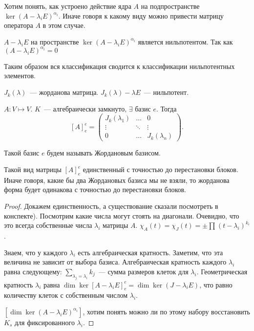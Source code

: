 \begin{motivation}
    Хотим понять, как устроено действие ядра $A$ на подпространстве $\ker (A - \lambda_iE)^{\alpha_i}$.
    Иначе говоря к какому виду можно привести матрицу оператора $A$ в этом случае.
\end{motivation}
\begin{remark}
    $A - \lambda_iE$ на пространстве $\ker(A - \lambda_iE)^{\alpha_i}$ является нильпотентом.
    Так как $(A - \lambda_iE)^{\alpha_i} = 0$
\end{remark}
\begin{motivation}
    Таким образом вся классификация сводится к классификации нильпотентных элементов.
\end{motivation}
\begin{definition}
    $J_k(\lambda)$~--- жорданова матрица.
    $J_k(\lambda) - \lambda E$~--- нильпотент.
\end{definition}
\begin{theorem}
    $A\colon V\mapsto V$. $K$~--- алгебраически замкнуто, $\exists$ базис $e$.
    Тогда 
     \[
         [A]^e_e =
         \begin{pmatrix}
             J_k(\lambda_1) & \dots & 0\\
             \vdots & \ddots & \vdots\\
             0 & \dots & J_k(\lambda_n)
         \end{pmatrix}
    .\] 
    \begin{definition}
        Такой базис $e$ будем называть Жордановым базисом.
    \end{definition}
    Такой вид матрицы $[A]^e_e$ единственный с точностью до перестановки блоков.
    Иначе говоря, какие бы два Жордановых базиса мы не взяли, то жорданова форма будет одинакова с точностью до перестановки блоков.
\end{theorem}
\begin{proof}
    Докажем единственность, а существование сказали посмотреть в конспекте).
    Посмотрим какие числа могут стоять на диагонали. Очевидно, что это всегда собственные числа $\lambda_i$ матрицы $A$.
    $\chi_A(t) = \chi_J(t) = \pm\prod\limits_{}^{}{(t-\lambda_i)^{k_i}}$.

    Знаем, что у каждого $\lambda_i$ есть алгебраическая кратность. Заметим, что эта величина не зависит от выбора базиса.
    Алгебраическая кратность каждого $\lambda_i$ равна следующему: $\sum\limits_{\lambda_j=\lambda_i}^{}{k_j}$~--- сумма размеров
    клеток для $\lambda_i$. Геометрическая кратность $\lambda_i$  равна 
    $\dim \ker [A- \lambda_iE]^e_e = \dim \ker (J - \lambda_iE)$, что равно количеству клеток с собственным числом $\lambda_i$.

    $[\dim\ker(A - \lambda_iE)^{\alpha_i}]$, хотим понять можно ли по этому набору восстановить ${K_s}$ для 
    фиксированного $\lambda_i$.
\end{proof}
